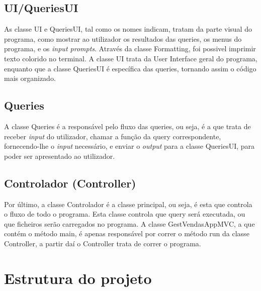 \documentclass[a4paper]{report}
\begin{document}
	\section{UI/QueriesUI}
	As classe UI e QueriesUI, tal como os nomes indicam, tratam da parte visual do programa, como mostrar ao utilizador os resultados das queries, os menus do programa, e os \textit{input prompts}. Através da classe Formatting, foi possivel imprimir texto colorido no terminal. A classe UI trata da User Interface geral do programa, enquanto que a classe QueriesUI é específica das queries, tornando assim o código mais organizado.
	
	\section{Queries}
	A classe Queries é a responsável pelo fluxo das queries, ou seja, é a que trata de receber \textit{input} do utilizador, chamar a função da query correspondente, fornecendo-lhe o \textit{input} necessário, e enviar o \textit{output} para a classe QueriesUI, para poder ser apresentado ao utilizador.
	
	\section{Controlador (Controller)}
	Por último, a classe Controlador é a classe principal, ou seja, é esta que controla o fluxo de todo o programa. Esta classe controla que query será executada, ou que ficheiros serão carregados no programa. A classe GestVendasAppMVC, a que contém o método main, é apenas responsável por correr o método run da classe Controller, a partir daí o Controller trata de correr o programa.
	
	\chapter{Estrutura do projeto}
	
\end{document}
